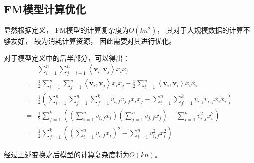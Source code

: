 \subsection{FM模型计算优化}

显然根据定义，
FM模型的计算复杂度为$O(kn^2)$，
其对于大规模数据的计算不够友好，
较为消耗计算资源，
因此需要对其进行优化。

对于模型定义中的后半部分，可以得出：
\begin{equation}
    \begin{aligned}
          & \sum_{i=1}^{n} \sum_{j=i+1}^{n}\left\langle\mathbf{v}_{i}, \mathbf{v}_{j}\right\rangle x_{i} x_{j}                                                                                                         \\
        = & \frac{1}{2} \sum_{i=1}^{n} \sum_{j=1}^{n}\left\langle\mathbf{v}_{i}, \mathbf{v}_{j}\right\rangle x_{i} x_{j}-\frac{1}{2} \sum_{i=1}^{n}\left\langle\mathbf{v}_{i}, \mathbf{v}_{i}\right\rangle x_{i} x_{i} \\
        = & \frac{1}{2}\left(\sum_{i=1}^{n} \sum_{j=1}^{n} \sum_{f=1}^{k} v_{i, f} v_{j, f} x_{i} x_{j}-\sum_{i=1}^{n} \sum_{f=1}^{k} v_{i, f} v_{i, f} x_{i} x_{i}\right)                                             \\
        = & \frac{1}{2} \sum_{f=1}^{k}\left(\left(\sum_{i=1}^{n} v_{i, f} x_{i}\right)\left(\sum_{j=1}^{n} v_{j, f} x_{j}\right)-\sum_{i=1}^{n} v_{i, f}^{2} x_{i}^{2}\right)                                          \\
        = & \frac{1}{2} \sum_{f=1}^{k}\left({\left(\sum_{i=1}^{n} v_{i, f} x_{i}\right)}^{2}- \sum_{i=1}^{n} v_{i, f}^{2} x_{i}^{2}\right)
    \end{aligned}
\end{equation}

经过上述变换之后模型的计算复杂度将为$O(kn)$。